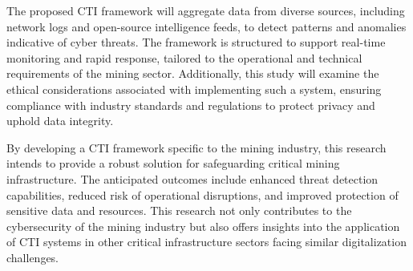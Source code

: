 \documentclass[a4paper,twoside,12pt]{report}
\begin{document}
The proposed CTI framework will aggregate data from diverse sources, including network logs and open-source intelligence feeds, to detect patterns and anomalies indicative of cyber threats. The framework is structured to support real-time monitoring and rapid response, tailored to the operational and technical requirements of the mining sector. Additionally, this study will examine the ethical considerations associated with implementing such a system, ensuring compliance with industry standards and regulations to protect privacy and uphold data integrity.

By developing a CTI framework specific to the mining industry, this research intends to provide a robust solution for safeguarding critical mining infrastructure. The anticipated outcomes include enhanced threat detection capabilities, reduced risk of operational disruptions, and improved protection of sensitive data and resources. This research not only contributes to the cybersecurity of the mining industry but also offers insights into the application of CTI systems in other critical infrastructure sectors facing similar digitalization challenges.




\end{document}
